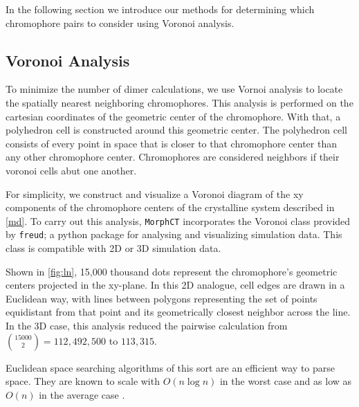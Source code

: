 In the following section we introduce our methods for determining
which chromophore pairs to consider using Voronoi analysis. 

\subsection{Voronoi Analysis}

To minimize the number of dimer calculations, we use Vornoi analysis to locate the spatially
nearest neighboring chromophores. This analysis is performed on the cartesian coordinates of
the geometric center of the chromophore. With that, a polyhedron cell is constructed around this geometric
center. The polyhedron cell consists of every point in space that is closer to that chromophore center than
any other chromophore center. Chromophores are considered neighbors if their voronoi cells abut one another.

For simplicity, we construct and visualize a Voronoi diagram of the xy components of the chromophore centers
of the crystalline  system described in \autoref{md}.
To carry out this analysis, \texttt{MorphCT} incorporates the
Voronoi class provided by \texttt{freud}; a python package for analysing and visualizing simulation data\cite{Ramasubramani2020}. 
This class is compatible with 2D or 3D simulation data. 

Shown in \autoref{fig:ln}, 15,000 thousand dots represent the chromophore's geometric centers projected
in the xy-plane. In this 2D analogue,
cell edges are drawn in a Euclidean way, with lines between polygons representing the set of points 
equidistant from that point and its geometrically closest neighbor across the line. 
In the 3D case, this analysis reduced the pairwise calculation from ${15000 \choose 2} = 112,492,500$
to $113,315$. 

Euclidean space searching algorithms of this sort are an efficient way to parse space. 
They are known to scale with $O(n\log{n})$ in the worst case and as low as $O(n)$ in the average case
\cite{Bentley1980}.


